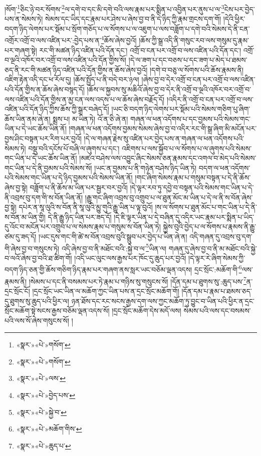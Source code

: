 །སོག་\footnote{«སྣར་»«པེ་»གསོག་}ཅིང་ཉེ་བར་སོགས་\footnote{«སྣར་»«པེ་»གསོག་}ལ་དགེ་བ་དང་མི་དགེ་བའི་ལས་རྣམ་པར་སྨིན་པ་འབྱིན་པར་ནུས་པ་ལ་\footnote{«སྣར་»«པེ་»ལས་}ངེས་པར་བྱེད་པས་ན་སེམས་ཏེ། སེམས་དང་ཡིད་དང་རྣམ་པར་ཤེས་པ་ཞེས་བྱ་བ་ནི་དེ་ཉིད་ཀྱི་རྣམ་གྲངས་དག་གོ། །དེའི་ཕྱིར་བདག་ཉིད་ལེགས་པར་སྡོམ་པ་སྲོག་གཅོད་པ་ལ་སོགས་པ་ལ་འཇུག་པ་ལས་བཟློག་པ་དགེ་བའི་སེམས་དེ་ནི་ངན་འགྲོར་འགྲོ་བ་ལས་འཛིན་པར་:བྱེད་པས་ན་\footnote{«སྣར་»«པེ་»བྱེད་པས་}ཆོས་ཞེས་བྱའོ། །ཆོས་ཀྱི་སྒྲ་འདི་ནི་གསུང་རབ་ལས་གསུམ་དུ་རྣམ་པར་གཞག་སྟེ། རང་གི་མཚན་ཉིད་འཛིན་པའི་དོན་དང་། འགྲོ་བ་ངན་པར་འགྲོ་བ་ལས་འཛིན་པའི་དོན་དང་། འགྲོ་བ་ལྔའི་འཁོར་བར་འགྲོ་བ་ལས་འཛིན་པའི་དོན་གྱིས་སོ། །དེ་ལ་ཟག་པ་དང་བཅས་པ་དང་ཟག་པ་མེད་པ་ཐམས་ཅད་ནི་རང་གི་མཚན་ཉིད་འཛིན་པའི་དོན་གྱིས་ན་ཆོས་ཞེས་བྱའོ། །དགེ་བ་བཅུ་ལ་སོགས་པའི་ཆོས་རྣམས་ནི། འཇིག་རྟེན་འདི་དང་ཕ་རོལ་དུ། །ཆོས་སྤྱོད་པ་ནི་བདེ་བར་ཉལ། །ཞེས་བྱ་བ་དེར་འགྲོ་བ་ངན་པར་འགྲོ་བ་ལས་འཛིན་པའི་དོན་གྱིས་ན་ཆོས་ཞེས་བསྙད་དོ། །ཆོས་ལ་སྐྱབས་སུ་མཆིའོ་ཞེས་བྱ་བ་དེར་ནི་འགྲོ་བ་ལྔའི་འཁོར་བར་འགྲོ་བ་ལས་འཛིན་པའི་དོན་གྱིས་ན་མྱ་ངན་ལས་འདས་པ་ལ་ཆོས་ཞེས་བརྗོད་དོ། །འདིར་ནི་འགྲོ་བ་ངན་པར་འགྲོ་བ་ལས་འཛིན་པའི་དོན་ཉིད་ཀྱིས་ཆོས་ཀྱི་སྒྲར་བཞེད་དོ། །ཡང་ཅི་བདག་ཉིད་ལེགས་པར་སྡོམ་པའི་སེམས་གཅིག་པུ་ཞིག་ཆོས་ཡིན་ནམ་ཞེ་ན། སྨྲས་པ། མ་ཡིན་ཏེ། འོ་ན་ཅི་ཞེ་ན། གཞན་ལ་ཕན་འདོགས་པ་དང་བྱམས་པའི་སེམས་གང་ཡིན་པ་དེ་ཡང་ཆོས་ཡིན་ནོ། །གཞན་ལ་ཕན་འདོགས་བྱམས་སེམས་ཞེས་བྱ་བ་འདིར་རང་གི་སྒྲ་ཞིག་མི་མངོན་པར་བྱས་ཤིང་བསྟན་པར་རིག་པར་བྱའོ། །དེ་ལ་གཞན་རྗེས་སུ་འཛིན་པར་བྱེད་པས་ན་གཞན་ལ་ཕན་འདོགས་པའི་སེམས་ཏེ། བསྡུ་བའི་དངོས་པོ་བཞི་ལ་ཞུགས་པ་དང་། འཇིགས་པ་ལས་སྐྱོབ་པ་ལ་སོགས་པ་ལ་ཞུགས་པའི་སེམས་གང་ཡིན་པ་དེ་ཡང་ཆོས་ཡིན་ནོ། །མཛའ་བཤེས་ལས་འབྱུང་ཞིང་སེམས་ཅན་རྣམས་དང་འགལ་བ་མེད་པའི་སེམས་གང་ཡིན་པ་དེ་ནི་བྱམས་པའི་སེམས་སོ། །ཡང་ན་བྱམས་པ་ནི་གཉེན་བཤེས་ཉིད་ཡིན་ཏེ། བདག་ལ་ཕན་འདོགས་པའི་སེམས་གང་ཡིན་པ་དེ་ཉིད་བྱམས་པའི་སེམས་ཡིན་ནོ། །གང་ཞིག་སེམས་རྣམ་པ་གསུམ་བསྟན་པ་དེ་ནི་ཆོས་ཞེས་བྱ་སྟེ། བཟློག་པ་ནི་ཆོས་མ་ཡིན་པར་སྦྱར་བར་བྱའོ། །དེ་ལྟར་རབ་ཏུ་དབྱེ་བ་བསྟན་པའི་སེམས་གང་ཡིན་པ་དེ་ནི་འབྲས་བུ་དག་གི་ས་བོན་ཡིན་ནོ། །རྒྱུ་གང་ཞིག་འབྲས་བུ་འགྲུབ་པ་ལ་ཐུན་མོང་མ་ཡིན་པ་དེ་ལ་ནི་ས་བོན་ཞེས་བྱ་སྟེ། དཔེར་ན་སཱ་ལུའི་ས་བོན་ནི་སཱ་ལུའི་མྱུ་གུའི་རྒྱུ་ཡིན་པ་ལྟ་བུའོ། །ས་ལ་སོགས་པ་ཐུན་མོང་པ་གང་ཡིན་པ་དེ་ནི་ས་བོན་མ་ཡིན་གྱི། དེ་ནི་རྒྱུ་ཉིད་ཡིན་པར་ཟད་དོ། །དེ་ཇི་ལྟར་ཡིན་པ་དེ་བཞིན་དུ་འདིར་ཡང་རྣམ་པར་སྨིན་པ་ཡིད་དུ་འོང་བ་མངོན་པར་འགྲུབ་པ་ལ་སེམས་རྣམ་པ་གསུམ་ས་བོན་ཡིན་ཏེ། སྐྱེས་བུའི་བྱེད་པ་ལ་སོགས་པ་རྣམས་ནི་རྒྱུ་ཙམ་དུ་ཟད་དོ། །ཡང་དུས་གང་གི་ཚེ་ས་བོན་འབྲས་བུའི་སྒྲུབ་པར་བྱེད་པ་ཡིན་ཞེ་ན། འདི་གཞན་དུ་འབྲས་བུ་དག་གི་ཞེས་བྱ་བ་གསུངས་ཏེ། འདི་ཞེས་བྱ་བ་ནི་མཐོང་བའི་:སྐྱེ་བ་ལ་\footnote{«སྣར་»«པེ་»སྐྱེ་བ་}ཡིན་ལ། གཞན་དུ་ཞེས་བྱ་བ་ནི་མ་མཐོང་བའི་སྐྱེ་བ་ལའོ་ཞེས་བྱ་བའི་ཐ་ཚིག་གོ། །འདི་ཡང་ལུང་ལས་རྒྱས་པར་ཁོང་དུ་ཆུད་པར་བྱའོ། །དེ་ལྟར་རེ་ཞིག་སེམས་ཀྱི་བདག་ཉིད་ཅན་གྱི་ཆོས་གཅིག་ཉིད་རྣམ་པར་གཞག་ནས་སླར་ཡང་བཅོམ་ལྡན་འདས། དྲང་སྲོང་:མཆོག་གི་\footnote{«སྣར་»«པེ་»མཆོག་གིས་}ལས་རྣམས་ནི། །སེམས་པ་དང་ནི་བསམས་པར་ཏེ་རྣམ་པ་གཉིས་སུ་གསུངས་སོ། །དོན་དམ་པ་ཐུགས་སུ་:ཆུད་པས་\footnote{«སྣར་»«པེ་»ཆུད་པ་}ན་དྲང་སྲོང་ངོ། །དྲང་སྲོང་ཡང་ཡིན་ལ་མཆོག་ཀྱང་ཡིན་པས་ན་དྲང་སྲོང་མཆོག་གོ། །དོན་དམ་པ་རྣམ་པ་ཐམས་ཅད་དུ་ཐུགས་སུ་ཆུད་པའི་ཕྱིར་ལ། ཉན་ཐོས་དང་རང་སངས་རྒྱས་དག་ལས་ཀྱང་མཆོག་ཏུ་བྱུང་བ་ཡིན་པའི་ཕྱིར་ན་དྲང་སྲོང་མཆོག་སྟེ་སངས་རྒྱས་བཅོམ་ལྡན་འདས་སོ། །དྲང་སྲོང་མཆོག་དེས་མདོ་ལས། སེམས་པའི་ལས་དང་བསམས་པའི་ལས་སོ་ཞེས་གསུངས་སོ། །

